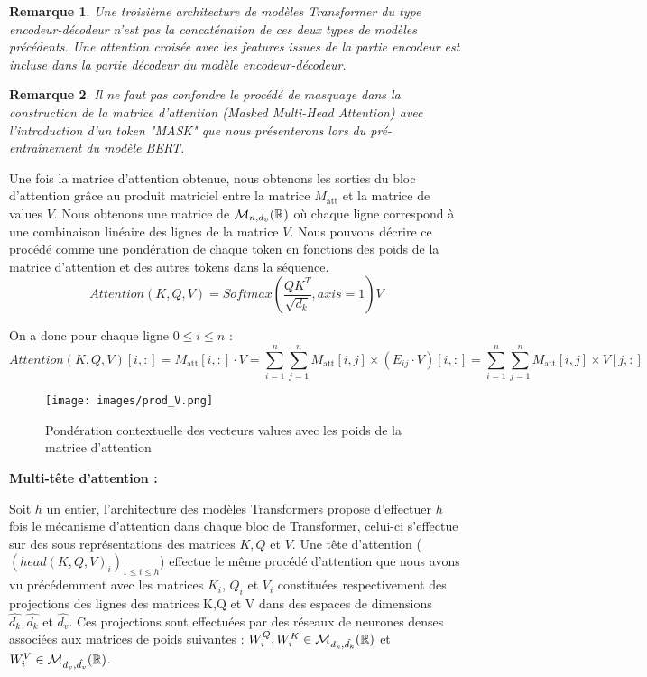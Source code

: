 \documentclass[12pt]{article}
\newtheorem{rmq}{Remarque}
\theoremstyle{definition}
\begin{document}
\begin{rmq}
	Une troisième architecture de modèles Transformer du type encodeur-décodeur n'est pas la concaténation de ces deux types de modèles précédents. Une attention croisée avec les features issues de la partie encodeur est incluse dans la partie décodeur du modèle encodeur-décodeur.
\end{rmq}

\begin{rmq}
	Il ne faut pas confondre le procédé de masquage dans la construction de la matrice d'attention (\emph{Masked Multi-Head Attention}) avec l'introduction d'un token \textit{"MASK"} que nous présenterons lors du pré-entraînement du modèle BERT.
\end{rmq}


Une fois la matrice d'attention obtenue, nous obtenons les sorties du bloc d'attention grâce au produit matriciel entre la matrice \(M_{\text{att}}\) et la matrice de values \(V\). Nous obtenons une matrice de \(\mathcal{M}_{n,d_v}(\mathbb{R})\) où chaque ligne correspond à une combinaison linéaire des lignes de la matrice \(V\). Nous pouvons décrire ce procédé comme une pondération de chaque token en fonctions des poids de la matrice d'attention et des autres tokens dans la séquence. 
$$Attention(K,Q,V) = Softmax\left(\dfrac{QK^T}{\sqrt{d_k}},axis = 1\right)V$$

On a donc pour chaque ligne $0\leq i \leq n$ :
	$$Attention(K,Q,V)[i,:] = M_{\text{att}}[i,:] \cdot V = \sum_{i=1}^{n}\sum_{j=1}^{n} M_{\text{att}}[i,j] \times \left(E_{ij}\cdot V\right)[i,:] = \sum_{i=1}^{n}\sum_{j=1}^{n} M_{\text{att}}[i,j] \times V[j,:]$$	
\begin{figure*}[!h]
	\centering
	\texttt{[image: images/prod\_V.png]}
	\caption{Pondération contextuelle des vecteurs values avec les poids de la matrice d'attention}
\end{figure*}

\textbf{Multi-tête d'attention :}

Soit $h$ un entier, l'architecture des modèles Transformers propose d'effectuer $h$ fois le mécanisme d'attention dans chaque bloc de Transformer, celui-ci s'effectue sur des sous représentations des matrices $K,Q$ et $V$. Une tête d'attention ($\left(head(K,Q,V)_i\right)_{1\leq i\leq h}$) effectue le même procédé d'attention que nous avons vu précédemment avec les matrices $K_i$, $Q_i$ et $V_i$ constituées respectivement des projections des lignes des matrices K,Q et V dans des espaces de dimensions $\hat{d_k},\hat{d_k}$ et $\hat{d_v}$. Ces projections sont effectuées par des réseaux de neurones denses associées aux matrices de poids suivantes : $W_i^Q, W_i^K\in\mathcal{M}_{d_k,\hat{d_k}}(\mathbb{R})$ et $W_i^V\in\mathcal{M}_{d_v,\hat{d_v}}(\mathbb{R})$.
\end{document}
